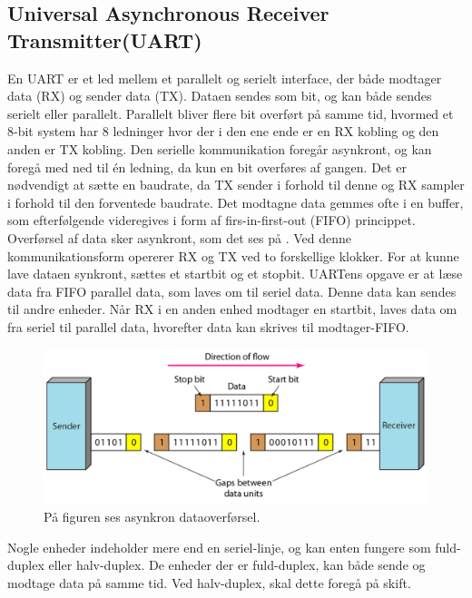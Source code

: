 \subsection{Universal Asynchronous Receiver Transmitter(UART)}
En UART er et led mellem et parallelt og serielt interface, der både modtager data (RX) og sender data (TX). Dataen sendes som bit, og kan både sendes serielt eller parallelt.\citep{Jimb02016a}\newline 
Parallelt bliver flere bit overført på samme tid, hvormed et 8-bit system har 8 ledninger hvor der i den ene ende er en RX kobling og den anden er TX kobling.\citep{Jimb02016a}\newline
Den serielle kommunikation foregår asynkront, og kan foregå med ned til én ledning, da kun en bit overføres af gangen. Det er nødvendigt at sætte en baudrate, da TX sender i forhold til denne og RX sampler i forhold til den forventede baudrate. Det modtagne data gemmes ofte i en buffer, som efterfølgende videregives i form af firs-in-first-out (FIFO) princippet.\citep{Jimb02016a,Chun-zhiYin-shuiLun-yao2011}\newline 
Overførsel af data sker asynkront, som det ses på . Ved denne kommunikationsform opererer RX og TX ved to forskellige klokker. For at kunne lave dataen synkront, sættes et startbit og et stopbit. UARTens opgave er at læse data fra FIFO parallel data, som laves om til seriel data. Denne data kan sendes til andre enheder. Når RX i en anden enhed modtager en startbit, laves data om fra seriel til parallel data, hvorefter data kan skrives til modtager-FIFO.\citep{Jimb02016a,Chun-zhiYin-shuiLun-yao2011} 

\begin{figure}[H]
	\centering
	\includegraphics[scale=0.6]{figures/bProblemloesning/asynkron.png}
	\caption{På figuren ses asynkron dataoverførsel.\citep{Sharma2016}}
	\label{fig:asynkron}
\end{figure}

Nogle enheder indeholder mere end en seriel-linje, og kan enten fungere som fuld-duplex eller halv-duplex. De enheder der er fuld-duplex, kan både sende og modtage data på samme tid. Ved halv-duplex, skal dette foregå på skift.\citep{Jimb02016a}